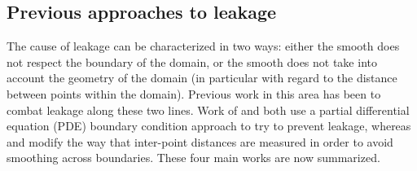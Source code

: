 \subsection{Previous approaches to leakage}
\label{intro-leakageapproaches}

The cause of leakage can be characterized in two ways: either the smooth does not respect the boundary of the domain, or the smooth does not take into account the geometry of the domain (in particular with regard to the distance between points within the domain). Previous work in this area has been to combat leakage along these two lines. Work of  and  both use a partial differential equation (PDE) boundary condition approach to try to prevent leakage, whereas  and  modify the way that inter-point distances are measured in order to avoid smoothing across boundaries. These four main works are now summarized.

